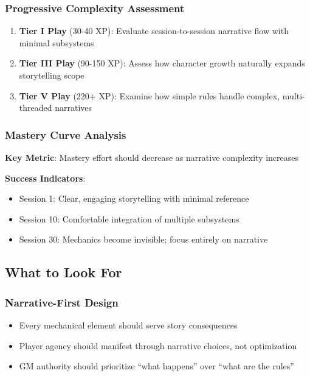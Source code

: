 \subsubsection{Progressive Complexity Assessment}
\begin{enumerate}
    \item \textbf{Tier I Play} (30-40 XP): Evaluate session-to-session narrative flow with minimal subsystems
    \item \textbf{Tier III Play} (90-150 XP): Assess how character growth naturally expands storytelling scope  
    \item \textbf{Tier V Play} (220+ XP): Examine how simple rules handle complex, multi-threaded narratives
\end{enumerate}

\subsubsection{Mastery Curve Analysis}
\textbf{Key Metric}: Mastery effort should decrease as narrative complexity increases

\textbf{Success Indicators}:
\begin{itemize}
    \item Session 1: Clear, engaging storytelling with minimal reference
    \item Session 10: Comfortable integration of multiple subsystems
    \item Session 30: Mechanics become invisible; focus entirely on narrative
\end{itemize}

\subsection{What to Look For}

\subsubsection{Narrative-First Design}
\begin{itemize}
    \item Every mechanical element should serve story consequences
    \item Player agency should manifest through narrative choices, not optimization
    \item GM authority should prioritize ``what happens'' over ``what are the rules''
\end{itemize}

